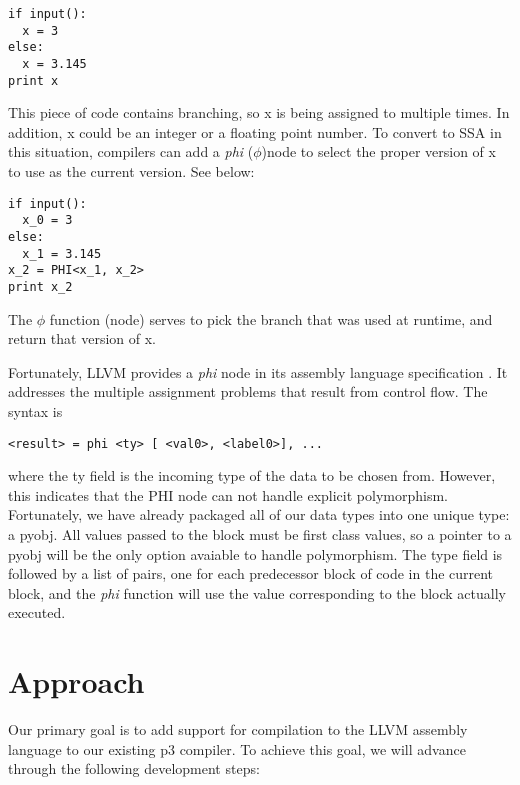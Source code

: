 \documentclass[11pt]{article}
\begin{document}
\begin{verbatim}
if input():
  x = 3
else:
  x = 3.145
print x
\end{verbatim}

This piece of code contains branching, so x is being assigned to
multiple times. In addition, x could be an integer or a floating point
number. To convert to SSA in this situation, compilers can add a
\emph{phi} ($\phi$)node to select the proper version of x to use as
the current version. See below:

\begin{verbatim}
if input():
  x_0 = 3
else:
  x_1 = 3.145
x_2 = PHI<x_1, x_2>
print x_2
\end{verbatim}

The $\phi$ function (node) serves to pick the branch that was used at
runtime, and return that version of x.

Fortunately, LLVM provides a \emph{phi} node in its assembly language
specification \cite{llvm.org}. It addresses the multiple assignment
problems that result from control flow. The syntax is

\begin{verbatim}
<result> = phi <ty> [ <val0>, <label0>], ...
\end{verbatim} 

where the ty field is the incoming type of the data to be chosen
from. However, this indicates that the PHI node can not handle explicit
polymorphism. Fortunately, we have already packaged all of our data
types into one unique type: a pyobj. All values passed to the block
must be first class values, so a pointer to a pyobj will be the only
option avaiable to handle polymorphism. The type field is followed by
a list of pairs, one for each predecessor block of code in the current
block, and the \emph{phi} function will use the value corresponding to
the block actually executed.

\section{Approach}

Our primary goal is to add support for compilation to the LLVM
assembly language to our existing p3 compiler. To achieve this goal,
we will advance through the following development steps:
\end{document}
